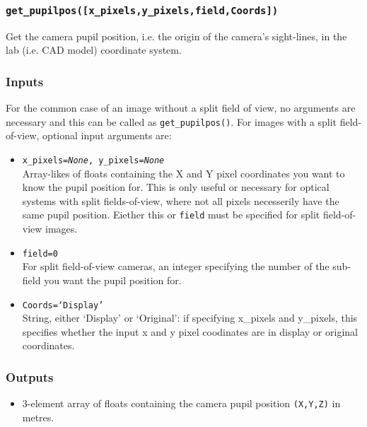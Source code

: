 \documentclass[12pt]{article}
\newcommand{\code}[1]{\texttt{#1}}
\begin{document}
\subsubsection*{\code{get\_pupilpos([x\_pixels,y\_pixels,field,Coords])}}
\begin{adjustwidth}{0.5cm}{0cm}
Get the camera pupil position, i.e. the origin of the camera's sight-lines, in the lab (i.e. CAD model) coordinate system. 
\subsubsection*{Inputs}
For the common case of an image without a split field of view, no arguments are necessary and this can be called as \code{get\_pupilpos()}. For images with a split field-of-view, optional input arguments are:
\begin{itemize}
\item{\code{x\_pixels={\it None}, y\_pixels={\it None}}\\ Array-likes of floats containing the X and Y pixel coordinates you want to know the pupil position for. This is only useful or necessary for optical systems with split fields-of-view, where not all pixels necesserily have the same pupil position. Eiether this or \code{field} must be specified for split field-of-view images.}
\item{\code{field=0}\\For split field-of-view cameras, an integer specifying the number of the sub-field you want the pupil position for.}
\item{\code{Coords=`Display'}\\String, either `Display' or `Original': if specifying x\_pixels and y\_pixels, this specifies whether the input x and y pixel coodinates are in display or original coordinates.}
\end{itemize}
\subsubsection*{Outputs} 
\begin{itemize}
\item{3-element array of floats containing the camera pupil position \code{(X,Y,Z)} in metres.}
\end{itemize}
\end{adjustwidth}
\end{document}
